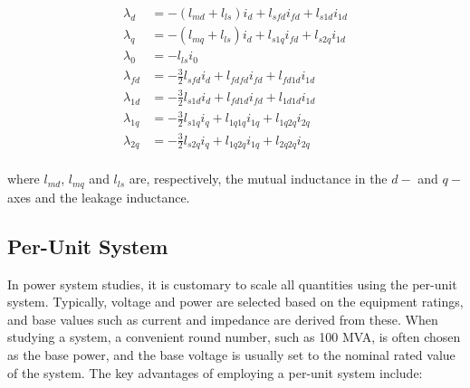 \begin{equation}\label{eq:fluxes_dq0}
    \begin{aligned}
        \lambda_d &= -(l_{md} + l_{ls}) i_d + l_{sfd} i_{fd} + l_{s1d}i_{1d}\\
        \lambda_q &= -(l_{mq} + l_{ls}) i_d + l_{s1q} i_{fd} + l_{s2q}i_{1d}\\
        \lambda_{0} &= -l_{ls} i_0\\
        \lambda_{fd} &= -\frac{3}{2} l_{sfd}i_d + l_{fdfd}i_{fd} + l_{fd1d}i_{1d}\\
        \lambda_{1d} &= -\frac{3}{2} l_{s1d}i_d + l_{fd1d}i_{fd} + l_{1d1d}i_{1d}\\
        \lambda_{1q} &= -\frac{3}{2} l_{s1q}i_q + l_{1q1q}i_{1q} + l_{1q2q}i_{2q}\\
        \lambda_{2q} &= -\frac{3}{2} l_{s2q}i_q + l_{1q2q}i_{1q} + l_{2q2q}i_{2q}\\
    \end{aligned}
\end{equation}

\noindent where $l_{md}$, $l_{mq}$ and $l_{ls}$ are, respectively, the mutual
inductance in the $d-$ and $q-$axes and the leakage inductance.

\subsection{Per-Unit System}

In power system studies, it is customary to scale all quantities using the
per-unit system. Typically, voltage and power are selected based on the
equipment ratings, and base values such as current and impedance are derived
from these. When studying a system, a convenient round number, such as 100 MVA,
is often chosen as the base power, and the base voltage is usually set to the
nominal rated value of the system. The key advantages of employing a per-unit
system include:

